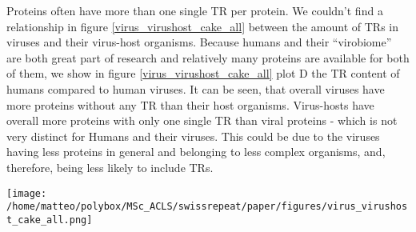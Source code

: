 \documentclass[a4,center,fleqn]{NAR}
\begin{document}
Proteins often have more than one single TR per protein. We couldn't find a %
relationship in figure \ref{virus_virushost_cake_all} between the amount of TRs in viruses and their virus-host organisms.
Because humans and their “virobiome” \cite{Ruff2017} 
are both great part of research and relatively many proteins are available for both of them, we show in figure \ref{virus_virushost_cake_all} plot D the TR content of humans compared to human viruses.
It can be seen, that overall viruses have more proteins without any TR than their host organisms. Virus-hosts have overall more proteins with only one single TR than viral proteins - which is not very distinct for Humans and their viruses. 
This could be due to the viruses having less proteins in general and belonging to less complex organisms, and, therefore, being less likely to include TRs.


\begin{figure*}[t]
\begin{center}
\texttt{[image: /home/matteo/polybox/MSc\_ACLS/swissrepeat/paper/figures/virus\_virushost\_cake\_all.png]}
\end{center}
\caption{The ratio of the amount of TR per protein is shown as the number of TRs per protein divided by the total amount of proteins per group. As grouping factor we show in plots A, B, C the three superkingdoms each split into superkingdom specific viruses and their hosts. The analogous principle is shown in plot D but for human related viruses compared to the TR distribution in human proteins. It can be seen, that overall viruses have more proteins without any TR than their host organisms. Virus-hosts have overall more proteins with only one single TR - which is not very distinct for Humans and their viruses. 
}
\label{virus_virushost_cake_all}
\end{figure*}





%
\end{document}
